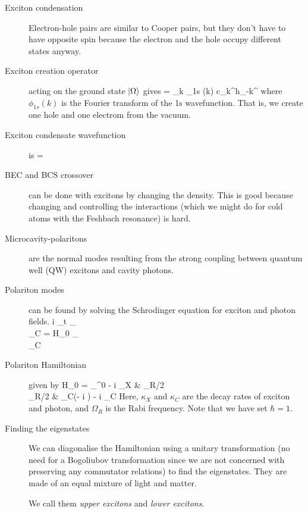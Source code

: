 \begin{description}
\item[Exciton condensation] Electron-hole pairs are similar to Cooper pairs, but they don't have to have opposite spin because the electron and the hole occupy different states anyway. 

\item[Exciton creation operator] acting on the ground state $\left| \Omega \right\rangle $ gives
\beq
\ket{\Phi} =  \sum_k \phi_{1s} (k) c_k^\dagger h_{-k}^\dagger \ket{\Omega}
\eeq
where $\phi_{1s}(k)$ is the Fourier transform of the 1s wavefunction. 
That is, we create one hole and one electrom from the vacuum. 

\item[Exciton condensate wavefunction] is
\beq
\ket{\Psi} =  
\eeq

\item[BEC and BCS crossover] can be done with excitons by changing the density. This is good because changing and controlling the interactions (which we might do for cold atoms with the Feshbach resonance) is hard. 

\item[Microcavity-polaritons] are the normal modes resulting from the strong coupling between quantum well (QW) excitons and cavity photons. 

\item[Polariton modes] can  be found by solving the Schrodinger equation for exciton and photon fields. 
\beq
i \p_t \bpmat \psi_\chi \\ \psi_C \epmat = H_0 \bpmat \psi_\chi \\ \psi_C\epmat
\eeq

\item[Polariton Hamiltonian] given by
\beq
H_0 = \bpmat \omega_\chi^0 - i \kappa_X & \Omega_R/2 \\ \Omega_R/2 & \omega_C(- i \nabla) - i \kappa_C \epmat
\eeq
Here, $\kappa_{X}$ and $\kappa_C$ are the decay rates of exciton and photon, and $\Omega_R$ is the Rabi frequency. Note that we have set $\hbar = 1$. 

\item[Finding the eigenstates] We can diagonalise the Hamiltonian using a unitary transformation (no need for a Bogoliubov transformation since we are not concerned with preserving any commutator relations) to find the eigenstates. They are made of an equal mixture of light and matter. 

We call them \emph{upper excitons} and \emph{lower excitons}. 


\end{description}
